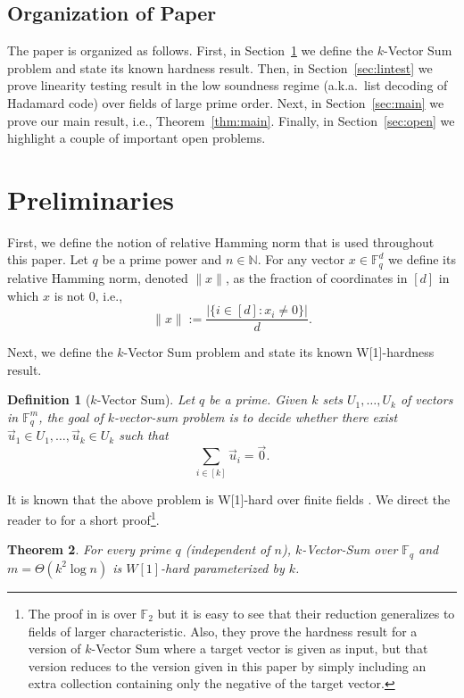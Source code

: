 \documentclass[10pt,a4paper]{article}
\newcommand{\F}{\mathbb{F}}
\newtheorem{theorem}{Theorem}[section]
\newtheorem{definition}[theorem]{Definition}
\begin{document}
\subsection{Organization of Paper}
The paper is organized as follows. 
First, in Section~\ref{sec:prelim} we define the $k$-Vector Sum problem and state its known hardness result.
Then, in Section~\ref{sec:lintest} we prove linearity testing result in the low soundness regime (a.k.a.\ list decoding of Hadamard code) over fields of large prime order.
Next, in Section~\ref{sec:main} we prove our main result, i.e., Theorem~\ref{thm:main}.
Finally, in Section~\ref{sec:open} we highlight a couple of important open problems. 

\section{Preliminaries}\label{sec:prelim}

First, we define the notion of relative Hamming norm that is used throughout this paper. 
Let $q$ be a prime power and $n\in\mathbb{N}$. For any vector $x\in \F_q^d$ we define its relative Hamming norm, denoted $\|x\|$, as the fraction of coordinates in $[d]$ in which $x$ is not 0, i.e., 
$$\|x\|:=\frac{|\{i\in[d]:x_i\neq 0\}|}{d}.
$$

Next, we define the $k$-Vector Sum problem and state its known W[1]-hardness result. 

\begin{definition}[$k$-Vector Sum]
Let $q$ be a prime.
Given $k$ sets $U_1,\ldots,U_k$ of vectors  in $\mathbb{F}_q^{m}$, the goal of $k$-vector-sum problem is to decide whether there exist $\vec{u}_1\in U_1,\ldots,\vec{u}_k\in U_k$ such that
\[
\sum_{i\in[k]}\vec{u}_i=\vec{0}.
\]
\end{definition}

It is known that the above problem is W[1]-hard over finite fields \cite{ALW13}. We direct the reader to \cite{L21} for a short proof\footnote{The proof in \cite{L21} is over $\F_2$ but it is easy to see that their reduction generalizes to fields of larger characteristic. Also, they prove the hardness result for a version of $k$-Vector Sum where  a target vector is given as input, but that version reduces to the version given in this paper by simply including an extra collection containing only the negative of the target vector.  }.

\begin{theorem}\cite{ALW13,L21}\label{thm:kvec}
For every prime $q$ (independent of $n$), 
$k$-Vector-Sum over $\mathbb{F}_q$  and $m=\Theta(k^2\log n)$ is $W[1]$-hard parameterized by $k$.  
\end{theorem}
\end{document}
